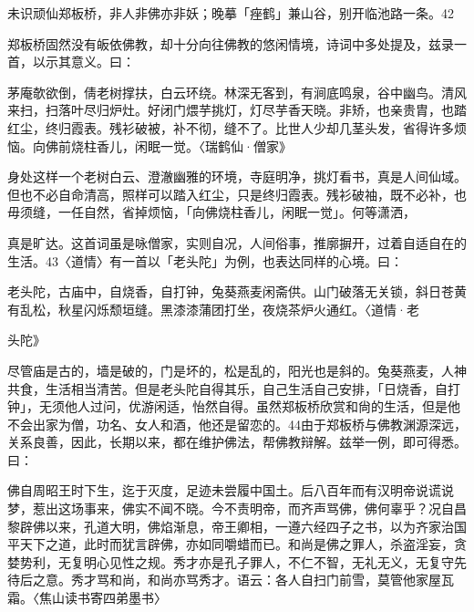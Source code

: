 未识顽仙郑板桥，非人非佛亦非妖；晚摹「痤鹤」兼山谷，别开临池路一条。42

郑板桥固然没有皈依佛教，却十分向往佛教的悠闲情境，诗词中多处提及，兹录一首，以示其意义。曰：

茅庵欹欲倒，倩老树撑扶，白云环绕。林深无客到，有涧底鸣泉，谷中幽鸟。清风来扫，扫落叶尽归炉灶。好闭门煨芋挑灯，灯尽芋香天晓。非矫，也亲贵胄，也踏红尘，终归霞表。残衫破被，补不彻，缝不了。比世人少却几茎头发，省得许多烦恼。向佛前烧柱香儿，闲眠一觉。〈瑞鹤仙·僧家》

身处这样一个老树白云、澄澈幽雅的环境，寺庭明净，挑灯看书，真是人间仙域。但也不必自命清高，照样可以踏入红尘，只是终归霞表。残衫破袖，既不必补，也毋须缝，一任自然，省掉烦恼，「向佛烧柱香儿，闲眠一觉」。何等潇洒，

\vfill
\begin{BookNotes}
\end{BookNotes}

\noindent 真是旷达。这首词虽是咏僧家，实则自况，人间俗事，推廓摒开，过着自适自在的生活。43〈道情〉有一首以「老头陀」为例，也表达同样的心境。曰：

\begin{BookQuote}
老头陀，古庙中，自烧香，自打钟，兔葵燕麦闲斋供。山门破落无关锁，斜日苍黄有乱松，秋星闪烁颓垣缝。黑漆漆蒲团打坐，夜烧茶炉火通红。〈道情·老
\end{BookQuote}

头陀》

尽管庙是古的，墙是破的，门是坏的，松是乱的，阳光也是斜的。兔葵燕麦，人神共食，生活相当清苦。但是老头陀自得其乐，自己生活自己安排，「日烧香，自打钟」，无须他人过问，优游闲适，怡然自得。虽然郑板桥欣赏和尙的生活，但是他不会出家为僧，功名、女人和酒，他还是留恋的。44由于郑板桥与佛教渊源深远，关系良善，因此，长期以来，都在维护佛法，帮佛教辩解。兹举一例，即可得悉。曰：

\begin{BookQuote}
佛自周昭王时下生，迄于灭度，足迹未尝履中国土。后八百年而有汉明帝说谎说梦，惹出这场事来，佛实不闻不晓。今不责明帝，而齐声骂佛，佛何辜乎？况自昌黎辟佛以来，孔道大明，佛焰渐息，帝王卿相，一遵六经四子之书，以为齐家治国平天下之道，此时而犹言辟佛，亦如同嚼蜡而已。和尚是佛之罪人，杀盗淫妄，贪婪势利，无复明心见性之规。秀才亦是孔子罪人，不仁不智，无礼无义，无复守先待后之意。秀才骂和尚，和尚亦骂秀才。语云：各人自扫门前雪，莫管他家屋瓦霜。〈焦山读书寄四弟墨书〉
\end{BookQuote}

